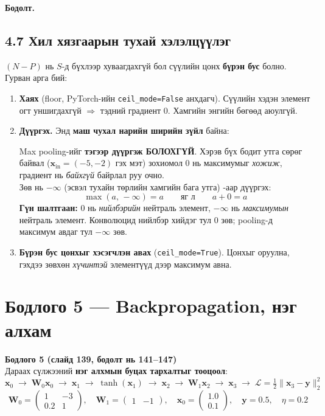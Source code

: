 \documentclass[11pt]{article}
\newenvironment{problem}[2][Бодлого]
    { \begin{mdframed}[backgroundcolor=gray!20] \textbf{#1 #2} \\}
    { \end{mdframed}}
\newenvironment{solution}[1][\textbf{Бодолт.}]
    { \noindent #1 \smallskip \\ }
    { \medskip }
\newcommand{\xin}{\mathbf{x}_{\mathrm{in}}}
\begin{document}
\begin{solution}
\subsection*{4.7 Хил хязгаарын тухай хэлэлцүүлэг}
$(N-P)$ нь $S$-д бүхлээр хуваагдахгүй бол сүүлийн цонх \textbf{бүрэн бус} болно.
Гурван арга бий:
\begin{enumerate}[leftmargin=*]
  \item \textbf{Хаях} (floor, PyTorch-ийн \texttt{ceil\_mode=False} анхдагч).
        Сүүлийн хэдэн элемент огт уншигдахгүй $\Rightarrow$ тэдний градиент $0$.
        Хамгийн энгийн бөгөөд аюулгүй.
  \item \textbf{Дүүргэх.} Энд \textbf{маш чухал нарийн ширийн зүйл} байна:
  \begin{mdframed}[backgroundcolor=red!8]
  Max pooling-ийг \textbf{тэгээр дүүргэж БОЛОХГҮЙ}. Хэрэв бүх бодит утга сөрөг байвал
  ($\xin = (-5,-2)$ гэх мэт) зохиомол $0$ нь максимумыг \emph{хожиж}, градиент нь
  \emph{байхгүй} байрлал руу очно. \\[4pt]
  Зөв нь $-\infty$ (эсвэл тухайн төрлийн хамгийн бага утга) -аар дүүргэх:
  \[
  \max(a,\,-\infty) = a \qquad \text{яг л} \qquad a + 0 = a
  \]
  \textbf{Гүн шалтгаан:} $0$ нь \emph{нийлбэрийн} нейтраль элемент, $-\infty$ нь
  \emph{максимумын} нейтраль элемент. Конволюцид нийлбэр хийдэг тул $0$ зөв;
  pooling-д максимум авдаг тул $-\infty$ зөв.
  \end{mdframed}
  \item \textbf{Бүрэн бус цонхыг хэсэгчлэн авах} (\texttt{ceil\_mode=True}).
        Цонхыг оруулна, гэхдээ зөвхөн \emph{хүчинтэй} элементүүд дээр максимум авна.
\end{enumerate}
\end{solution}

\section{Бодлого 5 — Backpropagation, нэг алхам}

\begin{problem}{5 (слайд 139, бодолт нь 141--147)}
Дараах сүлжээний \textbf{нэг алхмын буцах тархалтыг тооцоол}:
\[
\mathbf{x}_0 \;\to\; \boxed{\mathbf{W}_0\mathbf{x}_0} \;\to\; \mathbf{x}_1 \;\to\;
\boxed{\tanh(\mathbf{x}_1)} \;\to\; \mathbf{x}_2 \;\to\;
\boxed{\mathbf{W}_1\mathbf{x}_2} \;\to\; \mathbf{x}_3 \;\to\;
\boxed{\mathcal{L} = \tfrac12\|\mathbf{x}_3-\mathbf{y}\|_2^2}
\]
\[
\mathbf{W}_0 = \begin{pmatrix} 1 & -3 \\ 0.2 & 1 \end{pmatrix},\quad
\mathbf{W}_1 = \begin{pmatrix} 1 & -1 \end{pmatrix},\quad
\mathbf{x}_0 = \begin{pmatrix} 1.0 \\ 0.1 \end{pmatrix},\quad
\mathbf{y} = 0.5,\quad \eta = 0.2
\]
\end{problem}
\end{document}
